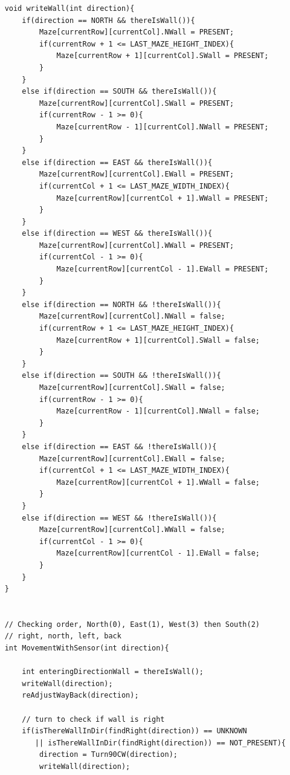 \documentclass[11pt]{article}
\begin{document}
\begin{linenumbers}
\begin{verbatim}
    void writeWall(int direction){
        if(direction == NORTH && thereIsWall()){
            Maze[currentRow][currentCol].NWall = PRESENT;
            if(currentRow + 1 <= LAST_MAZE_HEIGHT_INDEX){
                Maze[currentRow + 1][currentCol].SWall = PRESENT;
            }
        }
        else if(direction == SOUTH && thereIsWall()){
            Maze[currentRow][currentCol].SWall = PRESENT;
            if(currentRow - 1 >= 0){
                Maze[currentRow - 1][currentCol].NWall = PRESENT;
            }
        }
        else if(direction == EAST && thereIsWall()){
            Maze[currentRow][currentCol].EWall = PRESENT;
            if(currentCol + 1 <= LAST_MAZE_WIDTH_INDEX){
                Maze[currentRow][currentCol + 1].WWall = PRESENT;
            }
        }
        else if(direction == WEST && thereIsWall()){
            Maze[currentRow][currentCol].WWall = PRESENT;
            if(currentCol - 1 >= 0){
                Maze[currentRow][currentCol - 1].EWall = PRESENT;
            }
        }
        else if(direction == NORTH && !thereIsWall()){
            Maze[currentRow][currentCol].NWall = false;
            if(currentRow + 1 <= LAST_MAZE_HEIGHT_INDEX){
                Maze[currentRow + 1][currentCol].SWall = false;
            }
        }
        else if(direction == SOUTH && !thereIsWall()){
            Maze[currentRow][currentCol].SWall = false;
            if(currentRow - 1 >= 0){
                Maze[currentRow - 1][currentCol].NWall = false;
            }
        }
        else if(direction == EAST && !thereIsWall()){
            Maze[currentRow][currentCol].EWall = false;
            if(currentCol + 1 <= LAST_MAZE_WIDTH_INDEX){
                Maze[currentRow][currentCol + 1].WWall = false;
            }
        }
        else if(direction == WEST && !thereIsWall()){
            Maze[currentRow][currentCol].WWall = false;
            if(currentCol - 1 >= 0){
                Maze[currentRow][currentCol - 1].EWall = false;
            }
        }	
    }


    // Checking order, North(0), East(1), West(3) then South(2)
    // right, north, left, back
    int MovementWithSensor(int direction){

        int enteringDirectionWall = thereIsWall();
        writeWall(direction);
        reAdjustWayBack(direction);
        
        // turn to check if wall is right
        if(isThereWallInDir(findRight(direction)) == UNKNOWN 
           || isThereWallInDir(findRight(direction)) == NOT_PRESENT){
            direction = Turn90CW(direction);
            writeWall(direction);
            

\end{verbatim}
\end{linenumbers}
\end{document}
